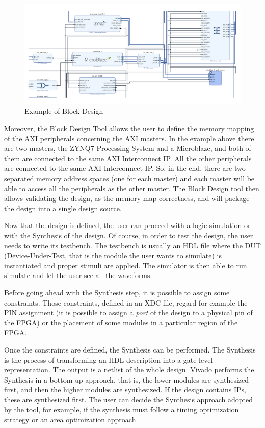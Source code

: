 \begin{figure}[H]
\centering
\includegraphics[width=0.75\linewidth]{images/chapter3/design_example-cropped.pdf}
\caption{Example of Block Design}
\label{fig:block_design_example}
\end{figure}

Moreover, the Block Design Tool allows the user to define the memory mapping of the AXI peripherals concerning the AXI masters. In the example above there are two masters, the ZYNQ7 Processing System and a Microblaze, and both of them are connected to the same AXI Interconnect IP. All the other peripherals are connected to the same AXI Interconnect IP. So, in the end, there are two separated memory address spaces (one for each master) and each master will be able to access all the peripherals as the other master. The Block Design tool then allows validating the design, as the memory map correctness, and will package the design into a single design source. \bigskip

Now that the design is defined, the user can proceed with a logic simulation or with the Synthesis of the design. Of course, in order to test the design, the user needs to write its testbench. The testbench is usually an HDL file where the DUT (Device-Under-Test, that is the module the user wants to simulate) is instantiated and proper stimuli are applied. The simulator is then able to run simulate and let the user see all the waveforms. \bigskip

Before going ahead with the Synthesis step, it is possible to assign some constraints. Those constraints, defined in an XDC file, regard for example the PIN assignment (it is possible to assign a \textit{port} of the design to a physical pin of the FPGA) or the placement of some modules in a particular region of the FPGA. \bigskip

Once the constraints are defined, the Synthesis can be performed. The Synthesis is the process of transforming an HDL description into a gate-level representation. The output is a netlist of the whole design. Vivado performs the Synthesis in a bottom-up approach, that is, the lower modules are synthesized first, and then the higher modules are synthesized. If the design contains IPs, these are synthesized first. The user can decide the Synthesis approach adopted by the tool, for example, if the synthesis must follow a timing optimization strategy or an area optimization approach. \bigskip

